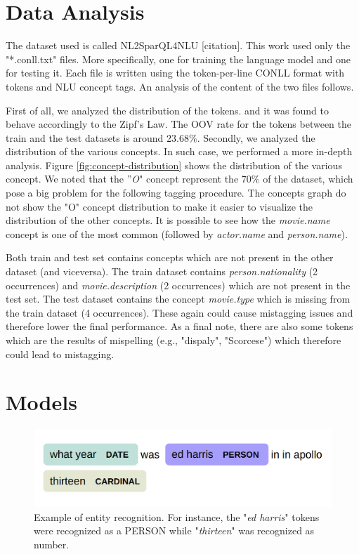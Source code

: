 \documentclass[11pt,a4paper]{article}
\begin{document}
\section{Data Analysis}

The dataset used is called NL2SparQL4NLU [citation]. This work used only the "*.conll.txt" files. More specifically, one for training the language model and one for testing it. Each file is written using the token-per-line CONLL format with tokens and NLU concept tags. An analysis of the content of the two files follows.

First of all, we analyzed the distribution of the tokens. and it was found to behave accordingly to the
Zipf's Law. The OOV rate for the tokens between the train and the test datasets is around $23.68\%$. 
Secondly, we analyzed the distribution of the various concepts. In such case, we performed a more in-depth analysis. Figure \ref{fig:concept-distribution} shows the distribution of the various concept. We noted that the ''\textit{O}" concept represent the $70\%$ of the dataset, which pose a big problem for the following tagging procedure. The concepts graph do not show the "O" concept distribution to make it easier to visualize the distribution of the other concepts. It is possible to see how the \textit{movie.name} concept is one of the most common (followed by \textit{actor.name} and \textit{person.name}). 

Both train and test set contains concepts which are not present in the other dataset (and viceversa). The train dataset contains \textit{person.nationality} (2 occurrences) and \textit{movie.description} (2 occurrences) which are not present in the test set. The test dataset contains the concept \textit{movie.type} which is missing from the train dataset (4 occurrences). These again could cause mistagging issues and therefore lower the final performance.
As a final note, there are also
some tokens which are the results of mispelling (e.g., "dispaly", "Scorcese") which therefore could lead to mistagging.


\section{Models}

\begin{figure}[b!]
\centering
	\includegraphics[width=1\linewidth]{img/entity}
	\caption{Example of entity recognition. For instance, the "\textit{ed harris}" tokens were recognized as a PERSON while "\textit{thirteen}" was recognized as number.}
	\label{fig:entity-recognition}
\end{figure}
\end{document}
